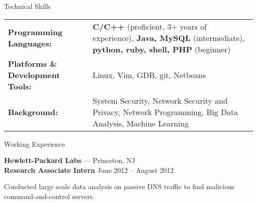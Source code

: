 \documentclass[11pt,oneside]{article}
\newenvironment{ressection_empty}[1]{
	\vspace{-1pt}
	{\fontfamily{phv}\selectfont\Large#1}
	
	\vspace{-8pt} \rule{\textwidth}{.5pt}
}
\newenvironment{ressection}[1]{
	{\fontfamily{phv}\selectfont\Large#1}
	
	\vspace{-8pt} \rule{\textwidth}{.5pt}
	
	\vspace{-4pt}
	\begin{itemize}
	\vspace{.5pt}
}{
	\end{itemize}
}
\newcommand{\resitem}[1]{
	\vspace{2pt}
	\item \begin{flushleft} #1 \end{flushleft}
}
\newcommand{\resbigitem}[3]{
	\vspace{-5pt}
	\item
	\textbf{#1} --- #2 \\
	{#3}
}
\newenvironment{ressubsec}[3]{
	\resbigitem{#1}{#2}{#3}
	\vspace{-4pt}
	\begin{itemize}
}{
	\end{itemize}
}
\begin{document}
\begin{ressection_empty}{Technical Skills}
\vspace{-20pt}
\begin{table}[h]
\begin{tabular}[h]{p{}p{}}

\textbf{Programming Languages:} & \textbf{C/C++} (proficient, 3+ years of experience), \textbf{Java, MySQL} (intermediate), \textbf{python, ruby, shell, PHP} (beginner)	\\[1.5pt]
\textbf{Platforms \& Development Tools:} & Linux, Vim, GDB, git, Netbeans	\\[1.5pt]
\textbf{Background:} & System Security, Network Security and Privacy, Network Programming, Big Data Analysis, Machine Learning \\
\end{tabular}
\end{table}
\vspace{-8pt}

\begin{comment}
	\resitem{
		\textbf{Programming Languages:} \textbf{C/C++} (proficient, 3+ years of experience), \textbf{Java} (intermediate), \textbf{python, ruby, PHP} (beginner)
	}
	\vspace{-4pt}
	\resitem{
		\textbf{Platforms \& Development Tools:} Linux, Vim, GDB, git, Netbeans
	}
	\vspace{-4pt}
	\resitem{
		\textbf{Background:} System Security, Network Security and Privacy, Network Programming, Big Data Analysis, Machine Learning
	}
\end{comment}


\end{ressection_empty}


\begin{ressection}{Working Experience}
	\begin{ressubsec}{Hewlett-Packard Labs}{Princeton, NJ}{\textbf{Research Associate Intern} \hfill June 2012 -- August 2012}
		\vspace{-2pt}
	\end{ressubsec}
\end{ressection}
\end{document}
